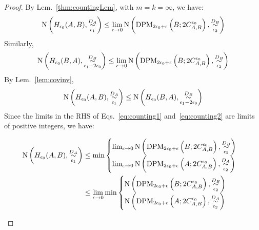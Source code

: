 \documentclass{article} %
\newcommand{\Cov}{\textnormal{N}}
\begin{document}
\begin{proof} By Lem.~\ref{thm:countingLem}, with $m = k = \infty$, we have:
\begin{equation}\label{eq:counting1}
\begin{aligned}
\Cov\left(H_{\epsilon_0}(A,B),\overset{D_A}{\underset{\epsilon_1}{\sim}}\right) 
&\leq \lim_{\epsilon \to 0} \Cov\left (\textnormal{DPM}_{2\epsilon_0+\epsilon}\left(B; 2C^{\epsilon_0}_{A,B} \right), \overset{D_B}{\underset{\epsilon_2}{\sim}} \right) \\
\end{aligned}
\end{equation}
Similarly, 
\begin{equation}\label{eq:counting2}
\begin{aligned}
\Cov\left(H_{\epsilon_0}(B,A),\overset{D_B}{\underset{\epsilon_1-2\epsilon_0}{\sim}}\right) 
&\leq \lim_{\epsilon \to 0} \Cov\left (\textnormal{DPM}_{2\epsilon_0+\epsilon}\left(B; 2C^{\epsilon_0}_{A,B} \right), \overset{D_B}{\underset{\epsilon_2}{\sim}} \right) \\
\end{aligned}
\end{equation}
By Lem.~\ref{lem:covinv},
\begin{equation}
\begin{aligned}
\Cov\left(H_{\epsilon_0}(A,B),\overset{D_A}{\underset{\epsilon_1}{\sim}}\right)  \leq \Cov\left(H_{\epsilon_0}(B,A),\overset{D_B}{\underset{\epsilon_1-2\epsilon_0}{\sim}}\right) 
\end{aligned}
\end{equation}
Since the limits in the RHS of Eqs.~\ref{eq:counting1} and~\ref{eq:counting2} are limits of positive integers, we have: 
\begin{small}
\begin{equation}
\begin{aligned}
\Cov\left(H_{\epsilon_0}(A,B),\overset{D_A}{\underset{\epsilon_1}{\sim}}\right) &\leq \min \begin{cases}
\lim_{\epsilon \to 0}\Cov\left (\textnormal{DPM}_{2\epsilon_0+\epsilon}\left(B; 2C^{\epsilon_0}_{A,B} \right), \overset{D_B}{\underset{\epsilon_2}{\sim}} \right)\\
\lim_{\epsilon \to 0} \Cov\left (\textnormal{DPM}_{2\epsilon_0+\epsilon}\left(A; 2C^{\epsilon_0}_{A,B} \right), \overset{D_A}{\underset{\epsilon_2}{\sim}} \right)
\end{cases}\\
&\leq 
\lim_{\epsilon \to 0} \min \begin{cases}
\Cov\left (\textnormal{DPM}_{2\epsilon_0+\epsilon}\left(B; 2C^{\epsilon_0}_{A,B} \right), \overset{D_B}{\underset{\epsilon_2}{\sim}} \right)\\
\Cov\left (\textnormal{DPM}_{2\epsilon_0+\epsilon}\left(A; 2C^{\epsilon_0}_{A,B} \right), \overset{D_A}{\underset{\epsilon_2}{\sim}} \right)
\end{cases}
\end{aligned}
\end{equation}
\end{small}
\end{proof} 
\end{document}
